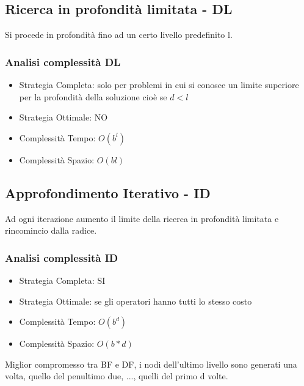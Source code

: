 \documentclass{article}
\begin{document}
\subsection{Ricerca in profondità limitata - DL}
Si procede in profondità fino ad un certo livello predefinito l.
\subsubsection{Analisi complessità DL}
\begin{itemize}
    \item Strategia Completa: solo per problemi in cui si conosce un limite superiore per la profondità della soluzione cioè se $d < l$
    \item Strategia Ottimale: NO
    \item Complessità Tempo: $O(b^l)$
    \item Complessità Spazio: $O(bl)$
\end{itemize}

\subsection{Approfondimento Iterativo - ID}
Ad ogni iterazione aumento il limite della ricerca in profondità limitata e rincomincio dalla radice.
\subsubsection{Analisi complessità ID}
\begin{itemize}
    \item Strategia Completa: SI
    \item Strategia Ottimale: se gli operatori hanno tutti lo stesso costo
    \item Complessità Tempo: $O(b^d)$
    \item Complessità Spazio: $O(b*d)$
\end{itemize}
Miglior compromesso tra BF e DF, i nodi dell'ultimo livello sono generati una volta, quello del penultimo due, ..., quelli del primo d volte.
\end{document}
